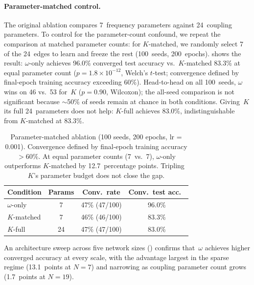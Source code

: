 \documentclass[11pt,a4paper]{article}
\begin{document}
\paragraph{Parameter-matched control.}
The original ablation compares 7~frequency parameters against
24~coupling parameters. To control for the parameter-count confound, we
repeat the comparison at matched parameter counts: for $K$-matched, we
randomly select 7 of the 24~edges to learn and freeze the rest (100~seeds,
200~epochs).  shows the result: $\omega$-only
achieves 96.0\% converged test accuracy vs.\ $K$-matched 83.3\% at equal
parameter count ($p = 1.8 \times 10^{-12}$, Welch's $t$-test; convergence
defined by final-epoch training accuracy exceeding 60\%).
Head-to-head on all 100~seeds, $\omega$ wins on 46 vs.\
53 for~$K$ ($p = 0.90$, Wilcoxon); the all-seed comparison is not
significant because $\sim$50\% of seeds remain at chance in both
conditions. Giving~$K$ its full 24~parameters does not help: $K$-full
achieves 83.0\%, indistinguishable from $K$-matched at 83.3\%.

\begin{table}[t]
  \centering
  \caption{%
    Parameter-matched ablation (100 seeds, 200 epochs, lr = 0.001).
    Convergence defined by final-epoch training accuracy $> 60\%$.
    At equal parameter counts (7~vs.~7), $\omega$-only outperforms
    $K$-matched by 12.7~percentage points. Tripling~$K$'s parameter
    budget does not close the gap.
  }
  \label{tab:param-matched}
  \begin{tabular}{@{}lccc@{}}
    \toprule
    Condition & Params & Conv.\ rate & Conv.\ test acc.\ \\
    \midrule
    $\omega$-only   & 7  & 47\% (47/100) & 96.0\% \\
    $K$-matched     & 7  & 46\% (46/100) & 83.3\% \\
    $K$-full        & 24 & 47\% (47/100) & 83.0\% \\
    \bottomrule
  \end{tabular}
\end{table}

An architecture sweep across five network sizes () confirms
that~$\omega$ achieves higher converged accuracy at every scale, with the
advantage largest in the sparse regime (13.1~points at $N{=}7$) and
narrowing as coupling parameter count grows (1.7~points at $N{=}19$).
\end{document}
